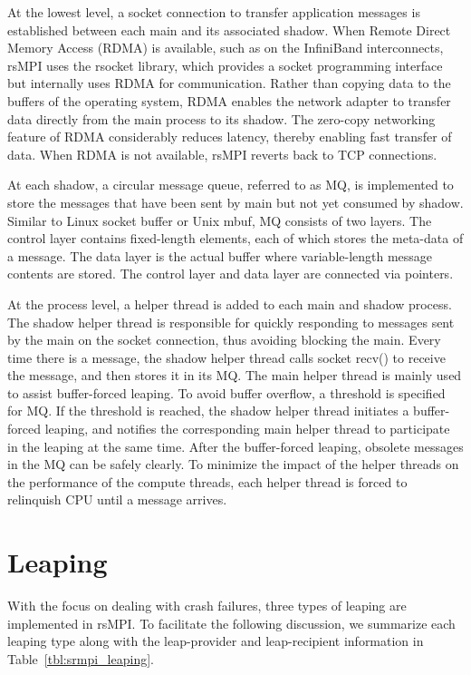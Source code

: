 At the lowest level, a socket connection to transfer application messages is established between each main and its associated shadow. When Remote Direct Memory Access (RDMA) is available, such as on the InfiniBand interconnects, rsMPI uses the rsocket library, which provides a socket programming interface but internally uses RDMA for communication. Rather than copying data to the buffers of the operating system, RDMA enables the network adapter to transfer data directly from the main process to its shadow. The zero-copy networking feature of RDMA considerably reduces latency, thereby enabling fast transfer of data. When RDMA is not available, rsMPI reverts back to TCP connections. 


At each shadow, a circular message queue, referred to as MQ, is implemented to store the messages that have been sent by main but not yet consumed by shadow. Similar to Linux socket buffer or Unix mbuf, MQ consists of two layers. The control layer contains fixed-length elements, each of which stores the meta-data of a message. The data layer is the actual buffer where variable-length message contents are stored. The control layer and data layer are connected via pointers. 

At the process level, a helper thread is added to each main and shadow process. The shadow helper thread is responsible for quickly responding to messages sent by the main on the socket connection, thus avoiding blocking the main. Every time there is a message, the shadow helper thread calls socket recv() to receive the message, and then stores it in its MQ. The main helper thread is mainly used to assist buffer-forced leaping. To avoid buffer overflow, a threshold is specified for MQ. If the threshold is reached, the shadow helper thread initiates a buffer-forced leaping, and notifies the corresponding main helper thread to participate in the leaping at the same time. After the buffer-forced leaping, obsolete messages in the MQ can be safely clearly. To minimize the impact of the helper threads on the performance of the compute threads, each helper thread is forced to relinquish CPU until a message arrives.





\section{Leaping}
With the focus on dealing with crash failures, three types of leaping are implemented in rsMPI. To facilitate the following discussion, we summarize each leaping type along with the leap-provider and leap-recipient information in Table~\ref{tbl:srmpi_leaping}.

